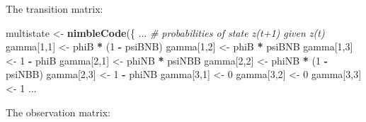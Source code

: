 \documentclass[
  12pt,
]{krantz}
\newenvironment{Shaded}{\begin{snugshade}}{\end{snugshade}}
\newcommand{\CommentTok}[1]{\textcolor[rgb]{0.56,0.35,0.01}{\textit{#1}}}
\newcommand{\DecValTok}[1]{\textcolor[rgb]{0.00,0.00,0.81}{#1}}
\newcommand{\FunctionTok}[1]{\textcolor[rgb]{0.13,0.29,0.53}{\textbf{#1}}}
\newcommand{\NormalTok}[1]{#1}
\newcommand{\OtherTok}[1]{\textcolor[rgb]{0.56,0.35,0.01}{#1}}
\newcommand{\SpecialCharTok}[1]{\textcolor[rgb]{0.81,0.36,0.00}{\textbf{#1}}}
\begin{document}
The transition matrix:

\begin{Shaded}
\begin{Highlighting}[]
\NormalTok{multistate }\OtherTok{\textless{}{-}} \FunctionTok{nimbleCode}\NormalTok{(\{}
\NormalTok{...}
  \CommentTok{\# probabilities of state z(t+1) given z(t)}
\NormalTok{  gamma[}\DecValTok{1}\NormalTok{,}\DecValTok{1}\NormalTok{] }\OtherTok{\textless{}{-}}\NormalTok{ phiB }\SpecialCharTok{*}\NormalTok{ (}\DecValTok{1} \SpecialCharTok{{-}}\NormalTok{ psiBNB)}
\NormalTok{  gamma[}\DecValTok{1}\NormalTok{,}\DecValTok{2}\NormalTok{] }\OtherTok{\textless{}{-}}\NormalTok{ phiB }\SpecialCharTok{*}\NormalTok{ psiBNB}
\NormalTok{  gamma[}\DecValTok{1}\NormalTok{,}\DecValTok{3}\NormalTok{] }\OtherTok{\textless{}{-}} \DecValTok{1} \SpecialCharTok{{-}}\NormalTok{ phiB}
\NormalTok{  gamma[}\DecValTok{2}\NormalTok{,}\DecValTok{1}\NormalTok{] }\OtherTok{\textless{}{-}}\NormalTok{ phiNB }\SpecialCharTok{*}\NormalTok{ psiNBB}
\NormalTok{  gamma[}\DecValTok{2}\NormalTok{,}\DecValTok{2}\NormalTok{] }\OtherTok{\textless{}{-}}\NormalTok{ phiNB }\SpecialCharTok{*}\NormalTok{ (}\DecValTok{1} \SpecialCharTok{{-}}\NormalTok{ psiNBB)}
\NormalTok{  gamma[}\DecValTok{2}\NormalTok{,}\DecValTok{3}\NormalTok{] }\OtherTok{\textless{}{-}} \DecValTok{1} \SpecialCharTok{{-}}\NormalTok{ phiNB}
\NormalTok{  gamma[}\DecValTok{3}\NormalTok{,}\DecValTok{1}\NormalTok{] }\OtherTok{\textless{}{-}} \DecValTok{0}
\NormalTok{  gamma[}\DecValTok{3}\NormalTok{,}\DecValTok{2}\NormalTok{] }\OtherTok{\textless{}{-}} \DecValTok{0}
\NormalTok{  gamma[}\DecValTok{3}\NormalTok{,}\DecValTok{3}\NormalTok{] }\OtherTok{\textless{}{-}} \DecValTok{1}
\NormalTok{...}
\end{Highlighting}
\end{Shaded}

The observation matrix:
\end{document}
